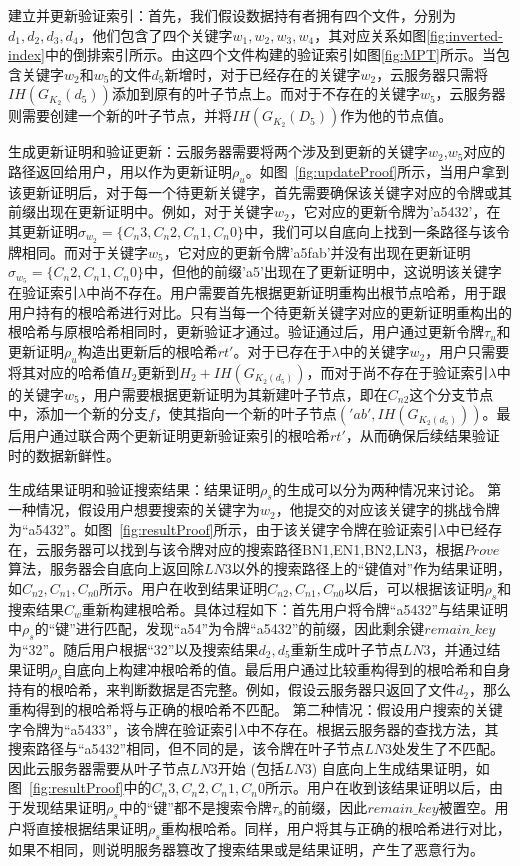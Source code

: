 {\heiti 建立并更新验证索引：}首先，我们假设数据持有者拥有四个文件，分别为$d_1,d_2,d_3,d_4$，他们包含了四个关键字$w_1,w_2,w_3,w_4$，其对应关系如图\ref{fig:inverted-index}中的倒排索引所示。由这四个文件构建的验证索引如图\ref{fig:MPT}所示。当包含关键字$w_2$和$w_5$的文件$d_5$新增时，对于已经存在的关键字$w_2$，云服务器只需将$IH(G_{K_2}(d_5))$添加到原有的叶子节点上。而对于不存在的关键字$w_5$，云服务器则需要创建一个新的叶子节点，并将$IH(G_{K_2}(D_5))$作为他的节点值。

{\heiti 生成更新证明和验证更新：}云服务器需要将两个涉及到更新的关键字$w_2$,$w_5$对应的路径返回给用户，用以作为更新证明$\rho_u$。如图~\ref{fig:updateProof}所示，当用户拿到该更新证明后，对于每一个待更新关键字，首先需要确保该关键字对应的令牌或其前缀出现在更新证明中。例如，对于关键字$w_2$，它对应的更新令牌为'a5432'，在其更新证明$\sigma_{w_2} = \{C_n3,C_n2,C_n1,C_n0\}$中，我们可以自底向上找到一条路径与该令牌相同。而对于关键字$w_5$，它对应的更新令牌'a5fab'并没有出现在更新证明$\sigma_{w_5} = \{C_n2,C_n1,C_n0\}$中，但他的前缀'a5'出现在了更新证明中，这说明该关键字在验证索引$\lambda$中尚不存在。用户需要首先根据更新证明重构出根节点哈希，用于跟用户持有的根哈希进行对比。只有当每一个待更新关键字对应的更新证明重构出的根哈希与原根哈希相同时，更新验证才通过。验证通过后，用户通过更新令牌$\tau_u$和更新证明$\rho_u$构造出更新后的根哈希$rt'$。对于已存在于$\lambda$中的关键字$w_2$，用户只需要将其对应的哈希值$H_2$更新到$H_2+IH(G_{K_2(d_5)})$，而对于尚不存在于验证索引$\lambda$中的关键字$w_5$，用户需要根据更新证明为其新建叶子节点，即在$C_{n2}$这个分支节点中，添加一个新的分支$f$，使其指向一个新的叶子节点$('ab', IH(G_{K_2(d_5)}))$。最后用户通过联合两个更新证明更新验证索引的根哈希$rt'$，从而确保后续结果验证时的数据新鲜性。

{\heiti 生成结果证明和验证搜索结果：}结果证明$\rho_s$的生成可以分为两种情况来讨论。
第一种情况，假设用户想要搜索的关键字为$w_2$，他提交的对应该关键字的挑战令牌为“a5432”。如图~\ref{fig:resultProof}所示，由于该关键字令牌在验证索引$\lambda$中已经存在，云服务器可以找到与该令牌对应的搜索路径{BN1,EN1,BN2,LN3}，根据$Prove$算法，服务器会自底向上返回除$LN3$以外的搜索路径上的“键值对”作为结果证明，如$C_{n2},C_{n1},C_{n0}$所示。用户在收到结果证明$C_{n2},C_{n1},C_{n0}$以后，可以根据该证明$\rho_s$和搜索结果$C_w$重新构建根哈希。具体过程如下：首先用户将令牌“a5432”与结果证明中$\rho_s$的“键”进行匹配，发现“a54”为令牌“a5432”的前缀，因此剩余键$remain\_key$ 为“32”。随后用户根据“32”以及搜索结果$d_2,d_5$重新生成叶子节点$LN3$，并通过结果证明$\rho_s$自底向上构建冲根哈希的值。最后用户通过比较重构得到的根哈希和自身持有的根哈希，来判断数据是否完整。例如，假设云服务器只返回了文件$d_2$，那么重构得到的根哈希将与正确的根哈希不匹配。
第二种情况：假设用户搜索的关键字令牌为“a5433”，该令牌在验证索引$\lambda$中不存在。根据云服务器的查找方法，其搜索路径与“a5432”相同，但不同的是，该令牌在叶子节点$LN3$处发生了不匹配。因此云服务器需要从叶子节点$LN3$开始 (包括$LN3$) 自底向上生成结果证明，如图~\ref{fig:resultProof}中的$C_n3,C_n2,C_n1,C_n0$所示。用户在收到该结果证明以后，由于发现结果证明$\rho_s$中的“键”都不是搜索令牌$\tau_s$的前缀，因此$remain\_key$被置空。用户将直接根据结果证明$\rho_s$重构根哈希。同样，用户将其与正确的根哈希进行对比，如果不相同，则说明服务器篡改了搜索结果或是结果证明，产生了恶意行为。


